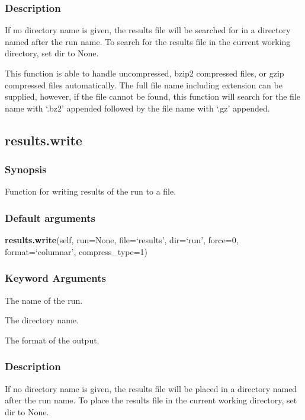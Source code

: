 \subsubsection{Description}

If no directory name is given, the results file will be searched for in a directory named
after the run name.  To search for the results file in the current working directory, set
dir to None.

This function is able to handle uncompressed, bzip2 compressed files, or gzip compressed
files automatically.  The full file name including extension can be supplied, however, if
the file cannot be found, this function will search for the file name with `.bz2' appended
followed by the file name with `.gz' appended.


\newpage

\subsection{results.write}


\subsubsection{Synopsis}

Function for writing results of the run to a file.

\subsubsection{Default arguments}

\textsf{\textbf{results.write}(self, run=None, file=`results', dir=`run', force=0, format=`columnar', compress\_type=1)}


\subsubsection{Keyword Arguments}

  The name of the run.

  The directory name.

  The format of the output.


\subsubsection{Description}

If no directory name is given, the results file will be placed in a directory named after
the run name.  To place the results file in the current working directory, set dir to None.

